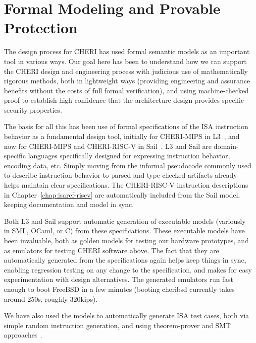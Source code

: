 \section{Formal Modeling and Provable Protection}

The design process for CHERI has used formal semantic models as an
important tool  in
various ways.
%
Our
goal here has been to understand how we can support the CHERI design
and engineering process with judicious use of mathematically rigorous
methods, both in lightweight ways (providing engineering and assurance
benefits without the costs of full formal verification), and using
machine-checked proof to establish high confidence that the
architecture design provides specific security properties.

The basis for all this has been use of formal specifications of the
ISA instruction behavior as a fundamental design tool, initially for
CHERI-MIPS in L3~\cite{Fox2015}, and now for CHERI-MIPS and
CHERI-RISC-V in Sail~\cite{sail-popl2019}.  L3 and Sail are
domain-specific languages specifically designed for expressing
instruction behavior, encoding data, etc.
Simply moving from the informal pseudocode commonly used to describe
instruction behavior to parsed and type-checked
artifacts already helps maintain clear specifications.
The CHERI-RISC-V instruction descriptions in Chapter~\ref{chap:isaref-riscv}
are automatically included from the Sail model, keeping documentation
and model in sync.

Both L3 and Sail support automatic generation of executable models
(variously in SML, OCaml, or C) from these specifications.  These
executable models have been invaluable, both as golden models for
testing our hardware prototypes, and as emulators for testing CHERI
software above.  The fact that they are automatically generated from
the specifications again helps keep things in sync, enabling
regression testing on any change to the specification, and makes for
easy experimentation with design alternatives.
The generated emulators run fast enough to boot FreeBSD in a few minutes (booting
cheribsd
currently takes around 250s, roughly 320kips).

We have also used the models to automatically generate ISA test cases,
both via simple random instruction generation, and using
theorem-prover and SMT approaches~\cite{DBLP:journals/scp/CampbellS16}.


